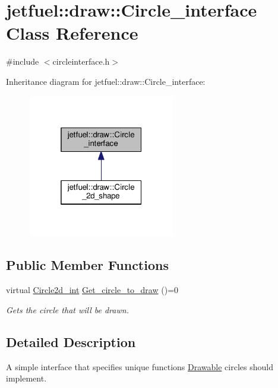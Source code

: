 \hypertarget{classjetfuel_1_1draw_1_1Circle__interface}{}\section{jetfuel\+:\+:draw\+:\+:Circle\+\_\+interface Class Reference}
\label{classjetfuel_1_1draw_1_1Circle__interface}


{\ttfamily \#include $<$circleinterface.\+h$>$}



Inheritance diagram for jetfuel\+:\+:draw\+:\+:Circle\+\_\+interface\+:\nopagebreak
\begin{figure}[H]
\begin{center}
\leavevmode
\includegraphics[width=181pt]{classjetfuel_1_1draw_1_1Circle__interface__inherit__graph}
\end{center}
\end{figure}
\subsection*{Public Member Functions}
\begin{DoxyCompactItemize}
\item 
virtual \hyperlink{classjetfuel_1_1draw_1_1Circle2d}{Circle2d\+\_\+int} \hyperlink{classjetfuel_1_1draw_1_1Circle__interface_a992a93bc130288ec4c9c4d2fa4203341}{Get\+\_\+circle\+\_\+to\+\_\+draw} ()=0
\begin{DoxyCompactList}\small\item\em Gets the circle that will be drawn. \end{DoxyCompactList}\end{DoxyCompactItemize}


\subsection{Detailed Description}
A simple interface that specifies unique functions \hyperlink{classjetfuel_1_1draw_1_1Drawable}{Drawable} circles should implement.

